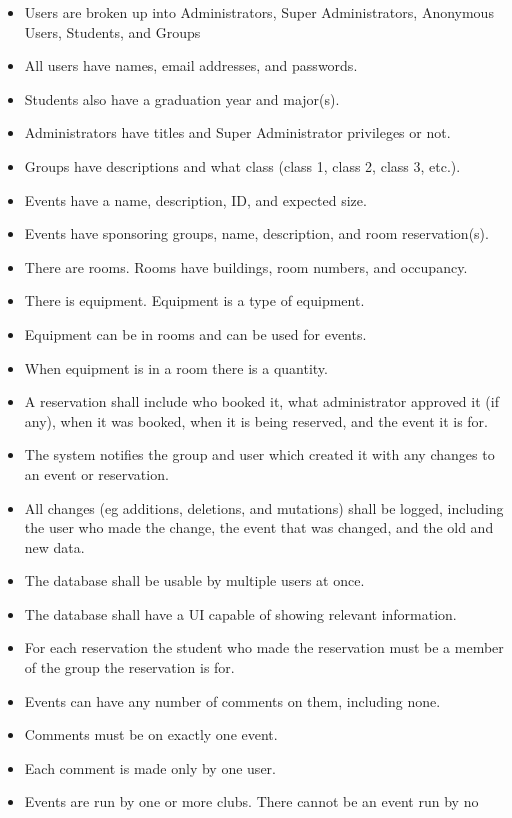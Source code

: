 \documentclass{article}
\begin{document}
\begin{itemize}
\item Users are broken up into Administrators, Super Administrators, Anonymous Users, Students, and Groups
\item All users have names, email addresses, and passwords.
\item Students also have a graduation year and major(s).
\item Administrators have titles and Super Administrator privileges or not. 
\item Groups have descriptions and what class (class 1, class 2, class 3, etc.).
\item Events have a name, description, ID, and expected size.
\item Events have sponsoring groups, name, description, and room reservation(s).
\item There are rooms. Rooms have buildings, room numbers, and occupancy.
\item There is equipment. Equipment is a type of equipment.
\item Equipment can be in rooms and can be used for events.
\item When equipment is in a room there is a quantity.
\item A reservation shall include who booked it, what administrator
approved it (if any), when it was booked, when it is being reserved,
and the event it is for.
\item The system notifies the group and user which created it with any
changes to an event or reservation.
\item All changes (eg additions, deletions, and mutations) shall be
logged, including the user who made the change, the event that was
changed, and the old and new data.
\item The database shall be usable by multiple users at once.
\item The database shall have a UI capable of showing relevant information.
\item For each reservation the student who made the reservation must
be a member of the group the reservation is for.
\item Events can have any number of comments on them, including none.
\item Comments must be on exactly one event.
\item Each comment is made only by one user.
\item Events are run by one or more clubs. There cannot be an event run by no

\end{itemize}
\end{document}
